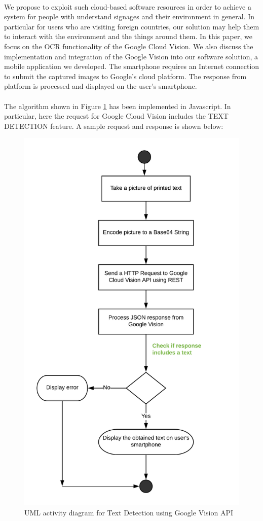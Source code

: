 \documentclass[12pt]{article}
\begin{document}
\paragraph{}We propose to exploit such cloud-based software resources in order to achieve a system for people with understand signages and their environment in general. In particular for users who are visiting foreign countries, our solution may help them to interact with the environment and the things around them. In this paper, we focus on the OCR functionality of the Google Cloud Vision. We also discuss the implementation and integration of the Google Vision into our software solution, a mobile application we developed. The smartphone requires an Internet connection to submit the captured images to Google’s cloud platform. The response from platform is processed and displayed on the user's smartphone.

\paragraph{}The algorithm shown in Figure \ref{fig:vision} has been implemented in Javascript. In particular, here the request for Google Cloud Vision includes the TEXT DETECTION feature. A sample request and response is shown below:

\begin{figure}[H]
	\centering
	\includegraphics[width=0.75\linewidth]{media/VISION_API.png}
	\caption{UML activity diagram for Text Detection using Google Vision API}
	\label{fig:vision}
\end{figure} 
\end{document}
